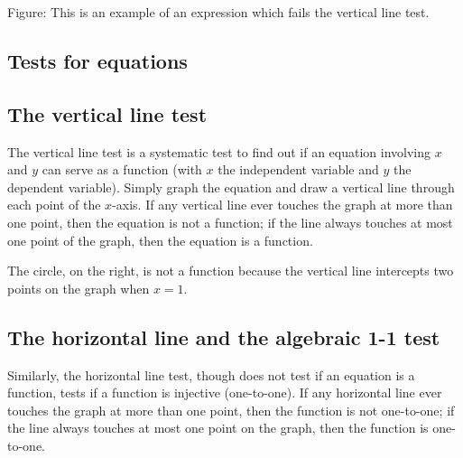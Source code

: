 Figure: This is an example of an expression which fails the vertical line test.




\subsection{Tests for equations}
\label{sss:test-28db}





\subsection{The vertical line test}
\label{sss:thev-18cb}




The vertical line test is a systematic test to find out if an equation involving $x$ and
$y$ can serve as a function (with $x$ the independent variable and $y$ the dependent
variable). Simply graph the equation and draw a vertical line through each point of the
$x$-axis. If any vertical line ever touches the graph at more than one point, then the
equation is not a function; if the line always touches at most one point of the graph,
then the equation is a function.



The circle, on the right, is not a function because the vertical line intercepts two
points on the graph when $x=1$.




\subsection{The horizontal line and the algebraic 1-1 test}
\label{sss:theh-25b4}




Similarly, the horizontal line test, though does not test if an equation is a function,
tests if a function is injective (one-to-one). If any horizontal line ever touches the
graph at more than one point, then the function is not one-to-one; if the line always
touches at most one point on the graph, then the function is one-to-one.



